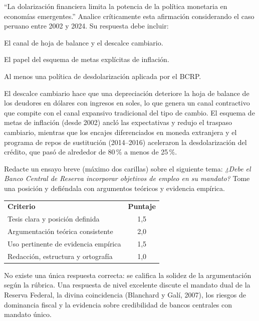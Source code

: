 \documentclass{evaluacion}
\begin{document}
\begin{pregunta}[6]
\enquote{La dolarización financiera limita la potencia de la política
monetaria en economías emergentes.} Analice críticamente esta afirmación
considerando el caso peruano entre 2002 y 2024. Su respuesta debe incluir:
\begin{apartados}
  \item El canal de hoja de balance y el descalce cambiario. 
  \item El papel del esquema de metas explícitas de inflación. 
  \item Al menos una política de desdolarización aplicada por el BCRP. 
\end{apartados}
\begin{solucion}
El descalce cambiario hace que una depreciación deteriore la hoja de
balance de los deudores en dólares con ingresos en soles, lo que genera un
canal contractivo que compite con el canal expansivo tradicional del tipo
de cambio. El esquema de metas de inflación (desde 2002) ancló las
expectativas y redujo el traspaso cambiario, mientras que los encajes
diferenciados en moneda extranjera y el programa de repos de sustitución
(2014--2016) aceleraron la desdolarización del crédito, que pasó de
alrededor de 80\,\% a menos de 25\,\%.
\end{solucion}
\end{pregunta}

\begin{pregunta}[6]
Redacte un ensayo breve (máximo dos carillas) sobre el siguiente tema:
\emph{¿Debe el Banco Central de Reserva incorporar objetivos de empleo en
su mandato?} Tome una posición y defiéndala con argumentos teóricos y
evidencia empírica.

\begin{criterios}
\begin{tabularx}{\linewidth}{@{}X c@{}}
  \textbf{Criterio} & \textbf{Puntaje}\\
  \arrayrulecolor{grislinea}\hline\addlinespace[3pt]
  Tesis clara y posición definida            & 1{,}5 \\
  Argumentación teórica consistente          & 2{,}0 \\
  Uso pertinente de evidencia empírica       & 1{,}5 \\
  Redacción, estructura y ortografía         & 1{,}0 \\
\end{tabularx}
\end{criterios}
\begin{solucion}
No existe una única respuesta correcta: se califica la solidez de la
argumentación según la rúbrica. Una respuesta de nivel excelente discute
el mandato dual de la Reserva Federal, la divina coincidencia
(Blanchard y Galí, 2007), los riesgos de dominancia fiscal y la evidencia
sobre credibilidad de bancos centrales con mandato único.
\end{solucion}
\end{pregunta}

\findelexamen
\end{document}
